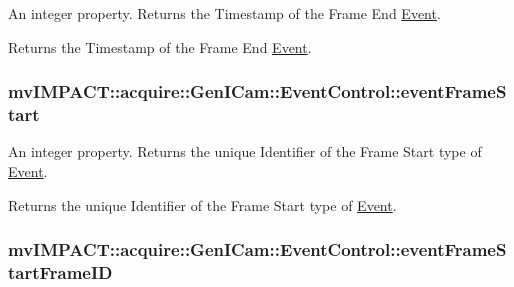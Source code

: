 An integer property. Returns the Timestamp of the Frame End \hyperlink{classmv_i_m_p_a_c_t_1_1acquire_1_1_event}{Event}. 

Returns the Timestamp of the Frame End \hyperlink{classmv_i_m_p_a_c_t_1_1acquire_1_1_event}{Event}. \hypertarget{classmv_i_m_p_a_c_t_1_1acquire_1_1_gen_i_cam_1_1_event_control_a91b1f1f0bd035af41f636fdbc6b3a598}{
\subsubsection[{event\+Frame\+Start}]{ mv\+I\+M\+P\+A\+C\+T\+::acquire\+::\+Gen\+I\+Cam\+::\+Event\+Control\+::event\+Frame\+Start}}\label{classmv_i_m_p_a_c_t_1_1acquire_1_1_gen_i_cam_1_1_event_control_a91b1f1f0bd035af41f636fdbc6b3a598}


An integer property. Returns the unique Identifier of the Frame Start type of \hyperlink{classmv_i_m_p_a_c_t_1_1acquire_1_1_event}{Event}. 

Returns the unique Identifier of the Frame Start type of \hyperlink{classmv_i_m_p_a_c_t_1_1acquire_1_1_event}{Event}. \hypertarget{classmv_i_m_p_a_c_t_1_1acquire_1_1_gen_i_cam_1_1_event_control_a4dd05b796d40c131763fcfc689d28315}{
\subsubsection[{event\+Frame\+Start\+Frame\+I\+D}]{ mv\+I\+M\+P\+A\+C\+T\+::acquire\+::\+Gen\+I\+Cam\+::\+Event\+Control\+::event\+Frame\+Start\+Frame\+I\+D}}\label{classmv_i_m_p_a_c_t_1_1acquire_1_1_gen_i_cam_1_1_event_control_a4dd05b796d40c131763fcfc689d28315}


